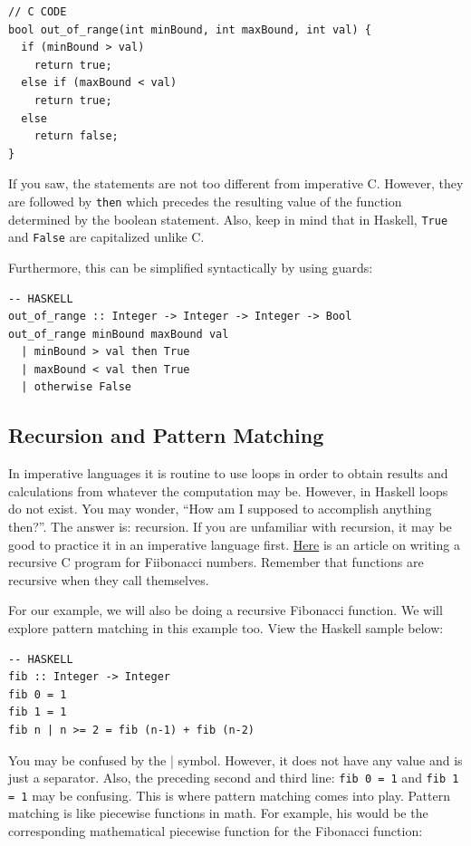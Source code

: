 \documentclass{article}
\begin{document}
\begin{lstlisting}[style=CStyle]
// C CODE
bool out_of_range(int minBound, int maxBound, int val) {
  if (minBound > val)
    return true;
  else if (maxBound < val)
    return true;
  else 
    return false;
}
\end{lstlisting}

\medskip\noindent
If you saw, the statements are not too different from imperative C. However, they are followed by \verb|then| which precedes the resulting value of the function determined by the boolean statement. Also, keep in mind that in Haskell, \verb|True| and \verb|False| are capitalized unlike C.

\medskip\noindent
Furthermore, this can be simplified syntactically by using guards:

\begin{lstlisting}[style=HaskellStyle]
-- HASKELL
out_of_range :: Integer -> Integer -> Integer -> Bool
out_of_range minBound maxBound val
  | minBound > val then True
  | maxBound < val then True
  | otherwise False
\end{lstlisting}

\subsection{Recursion and Pattern Matching}
\medskip\noindent
In imperative languages it is routine to use loops in order to obtain results and calculations from whatever the computation may be. However, in Haskell loops do not exist. You may wonder, “How am I supposed to accomplish anything then?”. The answer is: recursion. If you are unfamiliar with recursion, it may be good to practice it in an imperative language first. \href{https://www.geeksforgeeks.org/c-program-for-fibonacci-numbers/}{Here} is an article on writing a recursive C program for Fiibonacci numbers. Remember that functions are recursive when they call themselves.

\medskip\noindent
For our example, we will also be doing a recursive Fibonacci function. We will explore pattern matching in this example too. View the Haskell sample below:

\begin{lstlisting}[style=HaskellStyle]
-- HASKELL
fib :: Integer -> Integer
fib 0 = 1
fib 1 = 1
fib n | n >= 2 = fib (n-1) + fib (n-2)
\end{lstlisting}

\medskip\noindent
You may be confused by the | symbol. However, it does not have any value and is just a separator. Also, the preceding second and third line: \verb|fib 0 = 1| and \verb|fib 1 = 1| may be confusing. This is where pattern matching comes into play. Pattern matching is like piecewise functions in math. For example, his would be the corresponding mathematical piecewise function for the Fibonacci function:
\end{document}
